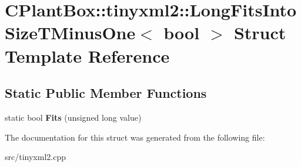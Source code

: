 \hypertarget{structCPlantBox_1_1tinyxml2_1_1LongFitsIntoSizeTMinusOne}{}\section{C\+Plant\+Box\+:\+:tinyxml2\+:\+:Long\+Fits\+Into\+Size\+T\+Minus\+One$<$ bool $>$ Struct Template Reference}
\label{structCPlantBox_1_1tinyxml2_1_1LongFitsIntoSizeTMinusOne}
\subsection*{Static Public Member Functions}
\begin{DoxyCompactItemize}
\item 
\mbox{\label{structCPlantBox_1_1tinyxml2_1_1LongFitsIntoSizeTMinusOne_a5c4266da0936711eddc0689ab4f8a7cd}} 
static bool {\bfseries Fits} (unsigned long value)
\end{DoxyCompactItemize}


The documentation for this struct was generated from the following file\+:\begin{DoxyCompactItemize}
\item 
src/tinyxml2.\+cpp\end{DoxyCompactItemize}
